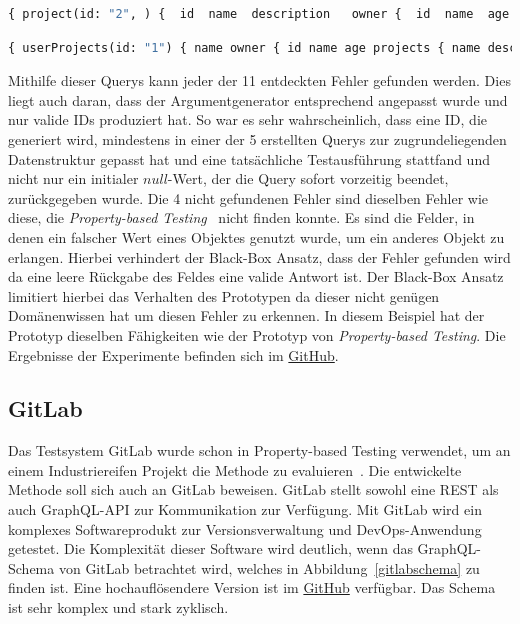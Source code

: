 \begin{lstlisting}[language=GraphQL, caption={Query 1}, label={q1}]
    { project(id: "2", ) {  id  name  description   owner {  id  name  age   }  }  }
\end{lstlisting}

\begin{lstlisting}[language=GraphQL, caption={Query2}, label={q2}]
    { userProjects(id: "1") { name owner { id name age projects { name description id owner { id name age } } } } }
\end{lstlisting}

Mithilfe dieser Querys kann jeder der 11 entdeckten Fehler gefunden werden.
Dies liegt auch daran, dass der Argumentgenerator entsprechend angepasst wurde und nur valide IDs produziert hat.
So war es sehr wahrscheinlich, dass eine ID, die generiert wird, mindestens in einer der 5 erstellten Querys zur zugrundeliegenden Datenstruktur gepasst hat
und eine tatsächliche Testausführung stattfand und nicht nur ein initialer $null$-Wert, der die Query sofort vorzeitig beendet, zurückgegeben wurde.
Die 4 nicht gefundenen Fehler sind dieselben Fehler wie diese, die \textit{Property-based Testing}~\cite[vgl. RQ.2]{property-based-testing} nicht finden konnte.
Es sind die Felder, in denen ein falscher Wert eines Objektes genutzt wurde, um ein anderes Objekt zu erlangen.
Hierbei verhindert der Black-Box Ansatz, dass der Fehler gefunden wird da eine leere Rückgabe des Feldes eine valide Antwort ist.
Der Black-Box Ansatz limitiert hierbei das Verhalten des Prototypen da dieser nicht genügen Domänenwissen hat um diesen Fehler zu erkennen.
In diesem Beispiel hat der Prototyp dieselben Fähigkeiten wie der Prototyp von \textit{Property-based Testing}.
Die Ergebnisse der Experimente befinden sich im \href{https://github.com/gernhard1337/GraphQL-Testautomatisierung/tree/main/experiment/toy-experiment}{GitHub}.

\subsection{GitLab}

Das Testsystem GitLab wurde schon in Property-based  Testing verwendet, um an einem Industriereifen Projekt die Methode zu evaluieren~\cite[vgl. Experiment]{property-based-testing}.
Die entwickelte Methode soll sich auch an GitLab beweisen.
GitLab stellt sowohl eine REST als auch GraphQL-API zur Kommunikation  zur  Verfügung.
Mit GitLab wird ein komplexes Softwareprodukt zur Versionsverwaltung und DevOps-Anwendung getestet.
Die Komplexität dieser Software wird deutlich, wenn das GraphQL-Schema von GitLab betrachtet wird, welches in Abbildung~\ref{gitlabschema} zu finden ist.
Eine hochauflösendere Version ist im \href{https://github.com/gernhard1337/GraphQL-Testautomatisierung/blob/main/latex/img/gitlabgraph.png}{GitHub} verfügbar.
Das Schema ist sehr komplex und stark zyklisch.

